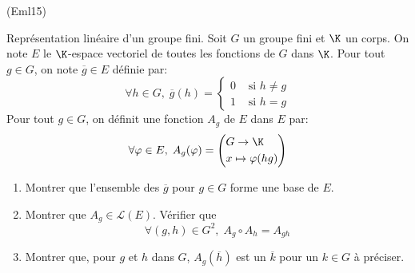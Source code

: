 \begin{tiny}(Eml15)\end{tiny} Représentation linéaire d'un groupe fini.\newline
Soit $G$ un groupe fini et $\K$ un corps. On note $E$ le $\K$-espace vectoriel de toutes les fonctions de $G$ dans $\K$. Pour tout $g\in G$, on note $\overline{g} \in E$ définie par:
\begin{displaymath}
\forall h \in G,\;\overline{g}(h) =
\left\lbrace 
\begin{aligned}
  0&\text{ si } h\neq g \\ 1 &\text{ si } h= g
\end{aligned}
\right. 
\end{displaymath}
Pour tout $g\in G$, on définit une fonction $A_g$ de $E$ dans $E$ par:
\begin{displaymath}
\forall \varphi \in E, \;
A_g(\varphi) =
\left(  
\begin{aligned}
& G \rightarrow \K \\ &x \mapsto \varphi(hg)   
\end{aligned}
\right) 
\end{displaymath}
\begin{enumerate}
  \item Montrer que l'ensemble des $\overline{g}$ pour $g\in G$ forme une base de $E$.
  \item Montrer que $A_g\in \mathcal{L}(E)$. Vérifier que
\begin{displaymath}
\forall(g,h)\in G^2,\;A_g\circ A_h = A_{gh}  
\end{displaymath}
  \item Montrer que, pour $g$ et $h$ dans $G$, $A_g(\overline{h})$ est un $\overline{k}$ pour un $k\in G$ à préciser.
\end{enumerate}
